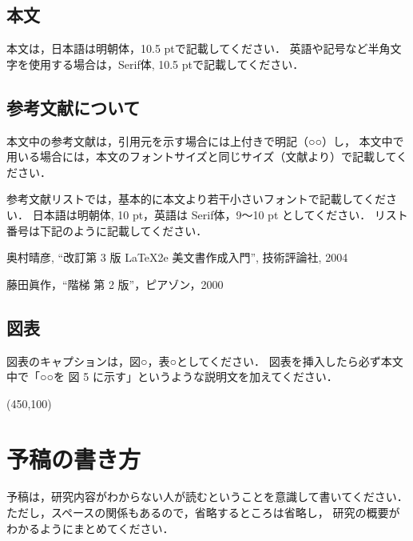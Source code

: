 \documentclass[twoside,twocolumn]{ujarticle}
\begin{document}
\subsection{本文}
%
本文は，日本語は明朝体，10.5 ptで記載してください．
英語や記号など半角文字を使用する場合は，Serif体, 10.5 ptで記載してください．
%
%
\subsection{参考文献について}
%
本文中の参考文献は，引用元を示す場合には上付きで明記（○○\cite{okumura}）し，
本文中で用いる場合には，本文のフォントサイズと同じサイズ（文献\Cite{okumura}より）で記載してください．

参考文献リストでは，基本的に本文より若干小さいフォントで記載してください．
日本語は明朝体, 10 pt，英語は Serif体，9〜10 pt としてください．
リスト番号は下記のように記載してください．
%
\renewcommand{\labelenumi}{[\arabic{enumi}]}
\begin{enumerate}
\small{
  \item 奥村晴彦, ``改訂第 3 版 \LaTeX2e 美文書作成入門'', 技術評論社, 2004
  \item 藤田眞作，``\LaTeXe 階梯 第 2 版''，ピアゾン，2000
}
\end{enumerate}
\renewcommand{\labelenumi}{\arabic{enumi}}
%
%
%
\subsection{図表}
%
図表のキャプションは，図○，表○としてください．
図表を挿入したら必ず本文中で「○○を 図 5 に示す」というような説明文を加えてください．
%
\begin{table}[t!]
  \centering
    \caption{○○}
    \framebox(450,100){}
  \label{tab:ex_tab1}
\end{table}
%
%
%
\section{予稿の書き方}
%
予稿は，研究内容がわからない人が読むということを意識して書いてください．
ただし，スペースの関係もあるので，省略するところは省略し，
研究の概要がわかるようにまとめてください．
%
%
\end{document}
